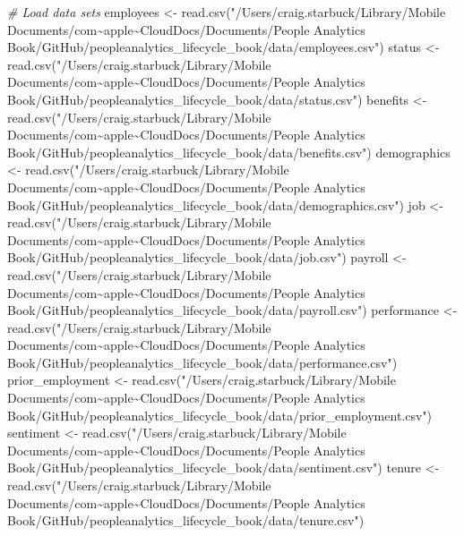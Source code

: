 \documentclass[
]{book}
\newenvironment{Shaded}{\begin{snugshade}}{\end{snugshade}}
\newcommand{\CommentTok}[1]{\textcolor[rgb]{0.56,0.35,0.01}{\textit{#1}}}
\newcommand{\FunctionTok}[1]{\textcolor[rgb]{0.00,0.00,0.00}{#1}}
\newcommand{\NormalTok}[1]{#1}
\newcommand{\OtherTok}[1]{\textcolor[rgb]{0.56,0.35,0.01}{#1}}
\newcommand{\StringTok}[1]{\textcolor[rgb]{0.31,0.60,0.02}{#1}}
\begin{document}
\begin{Shaded}
\begin{Highlighting}[]
\CommentTok{\# Load data sets}
\NormalTok{employees }\OtherTok{\textless{}{-}} \FunctionTok{read.csv}\NormalTok{(}\StringTok{"/Users/craig.starbuck/Library/Mobile Documents/com\textasciitilde{}apple\textasciitilde{}CloudDocs/Documents/People Analytics Book/GitHub/peopleanalytics\_lifecycle\_book/data/employees.csv"}\NormalTok{)}
\NormalTok{status }\OtherTok{\textless{}{-}} \FunctionTok{read.csv}\NormalTok{(}\StringTok{"/Users/craig.starbuck/Library/Mobile Documents/com\textasciitilde{}apple\textasciitilde{}CloudDocs/Documents/People Analytics Book/GitHub/peopleanalytics\_lifecycle\_book/data/status.csv"}\NormalTok{)}
\NormalTok{benefits }\OtherTok{\textless{}{-}} \FunctionTok{read.csv}\NormalTok{(}\StringTok{"/Users/craig.starbuck/Library/Mobile Documents/com\textasciitilde{}apple\textasciitilde{}CloudDocs/Documents/People Analytics Book/GitHub/peopleanalytics\_lifecycle\_book/data/benefits.csv"}\NormalTok{)}
\NormalTok{demographics }\OtherTok{\textless{}{-}} \FunctionTok{read.csv}\NormalTok{(}\StringTok{"/Users/craig.starbuck/Library/Mobile Documents/com\textasciitilde{}apple\textasciitilde{}CloudDocs/Documents/People Analytics Book/GitHub/peopleanalytics\_lifecycle\_book/data/demographics.csv"}\NormalTok{)}
\NormalTok{job }\OtherTok{\textless{}{-}} \FunctionTok{read.csv}\NormalTok{(}\StringTok{"/Users/craig.starbuck/Library/Mobile Documents/com\textasciitilde{}apple\textasciitilde{}CloudDocs/Documents/People Analytics Book/GitHub/peopleanalytics\_lifecycle\_book/data/job.csv"}\NormalTok{)}
\NormalTok{payroll }\OtherTok{\textless{}{-}} \FunctionTok{read.csv}\NormalTok{(}\StringTok{"/Users/craig.starbuck/Library/Mobile Documents/com\textasciitilde{}apple\textasciitilde{}CloudDocs/Documents/People Analytics Book/GitHub/peopleanalytics\_lifecycle\_book/data/payroll.csv"}\NormalTok{)}
\NormalTok{performance }\OtherTok{\textless{}{-}} \FunctionTok{read.csv}\NormalTok{(}\StringTok{"/Users/craig.starbuck/Library/Mobile Documents/com\textasciitilde{}apple\textasciitilde{}CloudDocs/Documents/People Analytics Book/GitHub/peopleanalytics\_lifecycle\_book/data/performance.csv"}\NormalTok{)}
\NormalTok{prior\_employment }\OtherTok{\textless{}{-}} \FunctionTok{read.csv}\NormalTok{(}\StringTok{"/Users/craig.starbuck/Library/Mobile Documents/com\textasciitilde{}apple\textasciitilde{}CloudDocs/Documents/People Analytics Book/GitHub/peopleanalytics\_lifecycle\_book/data/prior\_employment.csv"}\NormalTok{)}
\NormalTok{sentiment }\OtherTok{\textless{}{-}} \FunctionTok{read.csv}\NormalTok{(}\StringTok{"/Users/craig.starbuck/Library/Mobile Documents/com\textasciitilde{}apple\textasciitilde{}CloudDocs/Documents/People Analytics Book/GitHub/peopleanalytics\_lifecycle\_book/data/sentiment.csv"}\NormalTok{)}
\NormalTok{tenure }\OtherTok{\textless{}{-}} \FunctionTok{read.csv}\NormalTok{(}\StringTok{"/Users/craig.starbuck/Library/Mobile Documents/com\textasciitilde{}apple\textasciitilde{}CloudDocs/Documents/People Analytics Book/GitHub/peopleanalytics\_lifecycle\_book/data/tenure.csv"}\NormalTok{)}


\end{Highlighting}
\end{Shaded}
\end{document}
